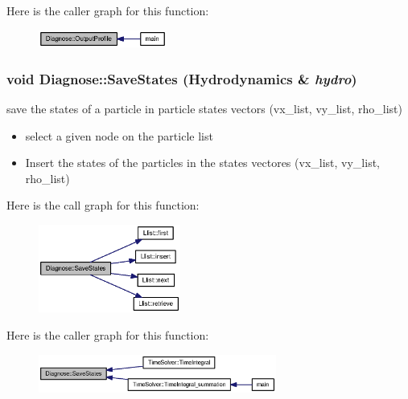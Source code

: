 Here is the caller graph for this function:\nopagebreak
\begin{figure}[H]
\begin{center}
\leavevmode
\includegraphics[width=119pt]{classDiagnose_db2f9991031fb8c301f44518c1d851ea_icgraph}
\end{center}
\end{figure}
\hypertarget{classDiagnose_bf6d65f3716a9d637186f97c62f7218b}{
\subsubsection[{SaveStates}]{\setlength{\rightskip}{0pt plus 5cm}void Diagnose::SaveStates ({\bf Hydrodynamics} \& {\em hydro})}}
\label{classDiagnose_bf6d65f3716a9d637186f97c62f7218b}


save the states of a particle in particle states vectors (vx\_\-list, vy\_\-list, rho\_\-list) 



\begin{itemize}
\item select a given node on the particle list\end{itemize}


\begin{itemize}
\item Insert the states of the particles in the states vectores (vx\_\-list, vy\_\-list, rho\_\-list) \end{itemize}


Here is the call graph for this function:\nopagebreak
\begin{figure}[H]
\begin{center}
\leavevmode
\includegraphics[width=132pt]{classDiagnose_bf6d65f3716a9d637186f97c62f7218b_cgraph}
\end{center}
\end{figure}


Here is the caller graph for this function:\nopagebreak
\begin{figure}[H]
\begin{center}
\leavevmode
\includegraphics[width=221pt]{classDiagnose_bf6d65f3716a9d637186f97c62f7218b_icgraph}
\end{center}
\end{figure}


